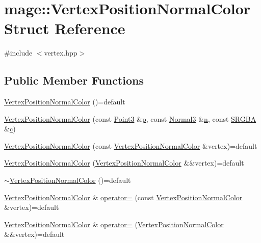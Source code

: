 \hypertarget{structmage_1_1_vertex_position_normal_color}{}\section{mage\+:\+:Vertex\+Position\+Normal\+Color Struct Reference}
\label{structmage_1_1_vertex_position_normal_color}


{\ttfamily \#include $<$vertex.\+hpp$>$}

\subsection*{Public Member Functions}
\begin{DoxyCompactItemize}
\item 
\hyperlink{structmage_1_1_vertex_position_normal_color_a8c8eff8f2fc3520bec482e89e2b32119}{Vertex\+Position\+Normal\+Color} ()=default
\item 
\hyperlink{structmage_1_1_vertex_position_normal_color_a68855e1bef5b58c89bf7819eb6903573}{Vertex\+Position\+Normal\+Color} (const \hyperlink{structmage_1_1_point3}{Point3} \&\hyperlink{structmage_1_1_vertex_position_normal_color_a6847c367ca68fb8d8e349c8441ae63dd}{p}, const \hyperlink{structmage_1_1_normal3}{Normal3} \&\hyperlink{structmage_1_1_vertex_position_normal_color_a771c7e71e8b6441b73f513f511507650}{n}, const \hyperlink{structmage_1_1_s_r_g_b_a}{S\+R\+G\+BA} \&\hyperlink{structmage_1_1_vertex_position_normal_color_a32876d6ab674130330651f9fa3daabd0}{c})
\item 
\hyperlink{structmage_1_1_vertex_position_normal_color_ad9fd4fa7c1da6aaf70f8241d3c7f261c}{Vertex\+Position\+Normal\+Color} (const \hyperlink{structmage_1_1_vertex_position_normal_color}{Vertex\+Position\+Normal\+Color} \&vertex)=default
\item 
\hyperlink{structmage_1_1_vertex_position_normal_color_aa2576c4e552f638bab84a715d1b53ea3}{Vertex\+Position\+Normal\+Color} (\hyperlink{structmage_1_1_vertex_position_normal_color}{Vertex\+Position\+Normal\+Color} \&\&vertex)=default
\item 
\hyperlink{structmage_1_1_vertex_position_normal_color_a4c51d0599843601d1cc1a6a55149aafe}{$\sim$\+Vertex\+Position\+Normal\+Color} ()=default
\item 
\hyperlink{structmage_1_1_vertex_position_normal_color}{Vertex\+Position\+Normal\+Color} \& \hyperlink{structmage_1_1_vertex_position_normal_color_aff39199b81977d3479976c83f7f51a4f}{operator=} (const \hyperlink{structmage_1_1_vertex_position_normal_color}{Vertex\+Position\+Normal\+Color} \&vertex)=default
\item 
\hyperlink{structmage_1_1_vertex_position_normal_color}{Vertex\+Position\+Normal\+Color} \& \hyperlink{structmage_1_1_vertex_position_normal_color_a81420d3cad27061049fe23bf4aaba64f}{operator=} (\hyperlink{structmage_1_1_vertex_position_normal_color}{Vertex\+Position\+Normal\+Color} \&\&vertex)=default
\end{DoxyCompactItemize}
